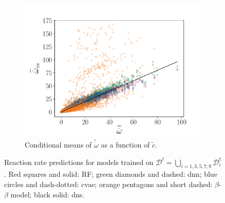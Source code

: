 \documentclass[review]{elsarticle}
\newcommand{\wt}[1]{\widetilde{#1}}
\begin{document}
\begin{figure}[!tbp]
\begin{subfigure}[t]{0.32\textwidth}
    \includegraphics[page=4,width=\textwidth, trim=0.5cm 0cm 1.5cm 1.3cm, clip=true]{./figs/convolution_skip.pdf}%
    \caption{Conditional means of $\wt{\dot{\omega}}$ as a function of $\wt{c}$.}%
  \end{subfigure}%
  \caption{Reaction rate predictions for models trained on $\mathcal{D}^t = \bigcup\limits_{i=1, 3, 5, 7, 9} \mathcal{D}_i^t$. Red squares and solid: RF; green diamonds and dashed: \gls{dnn}; blue circles and dash-dotted: \gls{cvae}; orange pentagons and short dashed: $\beta$-$\beta$ model; black solid: \gls{dns}.}\label{fig:convolution_skip}%
\end{figure}%
\end{document}
